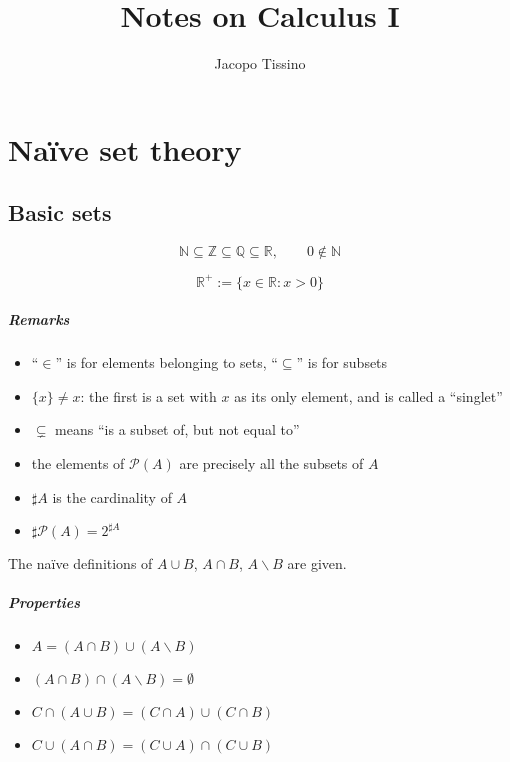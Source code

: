 \documentclass[12pt,a4paper]{report}
\author{Jacopo Tissino}
\title{Notes on Calculus I}
\numberwithin{equation}{section}
\theoremstyle{definition}
\theoremstyle{remark}
\begin{document}
\maketitle

\chapter{Naïve set theory}

\section{Basic sets}

\begin{equation}
\mathbb{N} \subseteq \mathbb{Z} \subseteq \mathbb{Q} \subseteq \mathbb{R}, \qquad 0 \not \in \mathbb{N}
\end{equation}

\begin{equation}
\mathbb{R}^+ := \lbrace x \in \mathbb{R} : x>0 \rbrace
\end{equation}

\paragraph{Remarks}

\begin{itemize}
\item ``$\in$'' is for elements belonging to sets, ``$\subseteq$'' is for subsets
\item $\lbrace x \rbrace \neq x$: the first is a set with $x$ as its only element, and is called a ``singlet''
\item $\subsetneq$  means ``is a subset of, but not equal to''
\item the elements of $\mathcal{P}(A)$ are precisely all the subsets of $A$
\item $\sharp A$ is the cardinality of $A$
\item $\sharp \mathcal{P} (A) = 2^{\sharp A}$
\end{itemize}

The naïve definitions of $A \cup B$, $A \cap B$, $A \smallsetminus B$ are given.

\paragraph{Properties}

\begin{itemize}
\item $A = (A \cap B ) \cup (A \smallsetminus B)$
\item $(A \cap B) \cap (A \smallsetminus B) = \emptyset$
\item $C \cap (A \cup B) = (C \cap A) \cup (C \cap B)$
\item $C \cup (A \cap B) = (C \cup A) \cap (C \cup B)$
\end{itemize}
\end{document}
